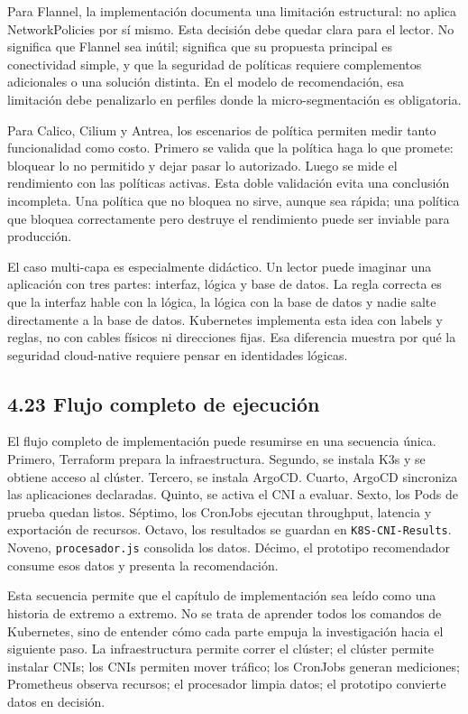 Para Flannel, la implementación documenta una limitación estructural: no aplica NetworkPolicies por sí mismo. Esta decisión debe quedar clara para el lector. No significa que Flannel sea inútil; significa que su propuesta principal es conectividad simple, y que la seguridad de políticas requiere complementos adicionales o una solución distinta. En el modelo de recomendación, esa limitación debe penalizarlo en perfiles donde la micro-segmentación es obligatoria.

Para Calico, Cilium y Antrea, los escenarios de política permiten medir tanto funcionalidad como costo. Primero se valida que la política haga lo que promete: bloquear lo no permitido y dejar pasar lo autorizado. Luego se mide el rendimiento con las políticas activas. Esta doble validación evita una conclusión incompleta. Una política que no bloquea no sirve, aunque sea rápida; una política que bloquea correctamente pero destruye el rendimiento puede ser inviable para producción.

El caso multi-capa es especialmente didáctico. Un lector puede imaginar una aplicación con tres partes: interfaz, lógica y base de datos. La regla correcta es que la interfaz hable con la lógica, la lógica con la base de datos y nadie salte directamente a la base de datos. Kubernetes implementa esta idea con labels y reglas, no con cables físicos ni direcciones fijas. Esa diferencia muestra por qué la seguridad cloud-native requiere pensar en identidades lógicas.

\subsection{4.23 Flujo completo de ejecución}

El flujo completo de implementación puede resumirse en una secuencia única. Primero, Terraform prepara la infraestructura. Segundo, se instala K3s y se obtiene acceso al clúster. Tercero, se instala ArgoCD. Cuarto, ArgoCD sincroniza las aplicaciones declaradas. Quinto, se activa el CNI a evaluar. Sexto, los Pods de prueba quedan listos. Séptimo, los CronJobs ejecutan throughput, latencia y exportación de recursos. Octavo, los resultados se guardan en \texttt{K8S-CNI-Results}. Noveno, \texttt{procesador.js} consolida los datos. Décimo, el prototipo recomendador consume esos datos y presenta la recomendación.

Esta secuencia permite que el capítulo de implementación sea leído como una historia de extremo a extremo. No se trata de aprender todos los comandos de Kubernetes, sino de entender cómo cada parte empuja la investigación hacia el siguiente paso. La infraestructura permite correr el clúster; el clúster permite instalar CNIs; los CNIs permiten mover tráfico; los CronJobs generan mediciones; Prometheus observa recursos; el procesador limpia datos; el prototipo convierte datos en decisión.

